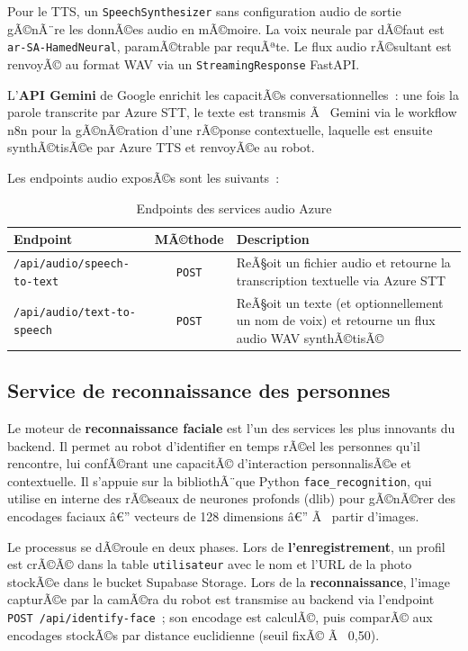Pour le TTS, un \texttt{SpeechSynthesizer} sans configuration
audio de sortie gÃ©nÃ¨re les donnÃ©es audio en mÃ©moire. La voix
neurale par dÃ©faut est \texttt{ar-SA-HamedNeural}, paramÃ©trable
par requÃªte. Le flux audio rÃ©sultant est renvoyÃ© au format WAV
via un \texttt{StreamingResponse} FastAPI.

L'\textbf{API Gemini} de Google enrichit les capacitÃ©s
conversationnelles~: une fois la parole transcrite par Azure STT,
le texte est transmis Ã  Gemini via le workflow n8n pour la
gÃ©nÃ©ration d'une rÃ©ponse contextuelle, laquelle est ensuite
synthÃ©tisÃ©e par Azure TTS et renvoyÃ©e au robot.

Les endpoints audio exposÃ©s sont les suivants~:

\begin{table}[H]
\centering
\caption{Endpoints des services audio Azure}
\label{tab:endpoints_audio}
\renewcommand{\arraystretch}{1.3}
\begin{tabular}{|l|c|p{7cm}|}
\hline
\textbf{Endpoint} & \textbf{MÃ©thode} & \textbf{Description} \\
\hline
\texttt{/api/audio/speech-to-text} & \texttt{POST}
  & ReÃ§oit un fichier audio et retourne la transcription textuelle
    via Azure STT \\
\hline
\texttt{/api/audio/text-to-speech} & \texttt{POST}
  & ReÃ§oit un texte (et optionnellement un nom de voix) et
    retourne un flux audio WAV synthÃ©tisÃ© \\
\hline
\end{tabular}
\end{table}

\subsection{Service de reconnaissance des personnes}

Le moteur de \textbf{reconnaissance faciale} est l'un des services
les plus innovants du backend. Il permet au robot d'identifier en
temps rÃ©el les personnes qu'il rencontre, lui confÃ©rant une
capacitÃ© d'interaction personnalisÃ©e et contextuelle. Il s'appuie
sur la bibliothÃ¨que Python \texttt{face\_recognition}, qui utilise
en interne des rÃ©seaux de neurones profonds (dlib) pour gÃ©nÃ©rer
des encodages faciaux â€” vecteurs de 128 dimensions â€” Ã  partir
d'images.

Le processus se dÃ©roule en deux phases. Lors de
\textbf{l'enregistrement}, un profil est crÃ©Ã© dans la table
\texttt{utilisateur} avec le nom et l'URL de la photo stockÃ©e
dans le bucket Supabase Storage. Lors de la
\textbf{reconnaissance}, l'image capturÃ©e par la camÃ©ra du robot
est transmise au backend via l'endpoint
\texttt{POST /api/identify-face}~; son encodage est calculÃ©, puis
comparÃ© aux encodages stockÃ©s par distance euclidienne (seuil
fixÃ© Ã  0,50).

